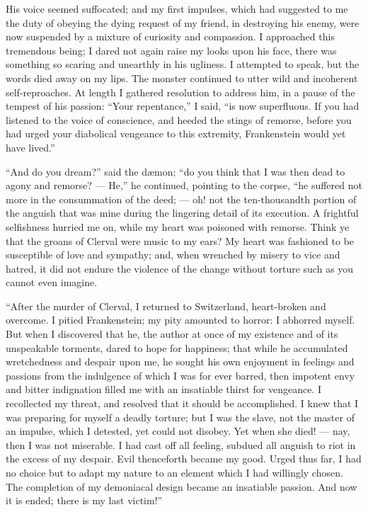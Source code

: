 His voice seemed suffocated; and
my first impulses, which had suggested
to me the duty of obeying the dying
request of my friend, in destroying his
enemy, were now suspended by a mixture
of curiosity and compassion. I
approached this tremendous being; I
dared not again raise my looks upon
his face, there was something so scaring
and unearthly in his ugliness. I
attempted to speak, but the words died
away on my lips. The monster continued
to utter wild and incoherent self-reproaches.
At length I gathered resolution
to address him, in a pause of the
tempest of his passion: ``Your repentance,''
I said, ``is now superfluous.
If you had listened to the voice of conscience,
and heeded the stings of remorse,
before you had urged your diabolical
vengeance to this extremity,
Frankenstein would yet have lived.''

``And do you dream?'' said the dæmon;
``do you think that I was then
dead to agony and remorse? --- He,'' he
continued, pointing to the corpse, ``he
suffered not more in the consummation
of the deed; --- oh! not the ten-thousandth
portion of the anguish that was
mine during the lingering detail of its
execution. A frightful selfishness hurried
me on, while my heart was poisoned
with remorse. Think ye that
the groans of Clerval were music to
my ears? My heart was fashioned to
be susceptible of love and sympathy;
and, when wrenched by misery to vice
and hatred, it did not endure the violence
of the change without torture
such as you cannot even imagine.

``After the murder of Clerval, I returned
to Switzerland, heart-broken
and overcome. I pitied Frankenstein;
my pity amounted to horror: I abhorred
myself. But when I discovered
that he, the author at once of my existence
and of its unspeakable torments,
dared to hope for happiness; that while
he accumulated wretchedness and despair
upon me, he sought his own enjoyment
in feelings and passions from
the indulgence of which I was for ever
barred, then impotent envy and bitter
indignation filled me with an insatiable
thirst for vengeance. I recollected my
threat, and resolved that it should be
accomplished. I knew that I was preparing
for myself a deadly torture; but
I was the slave, not the master of an
impulse, which I detested, yet could
not disobey. Yet when she died! --- nay,
then I was not miserable. I had cast
off all feeling, subdued all anguish
to riot in the excess of my despair.
Evil thenceforth became my good.
Urged thus far, I had no choice but to
adapt my nature to an element which
I had willingly chosen. The completion
of my demoniacal design became
an insatiable passion. And now it
is ended; there is my last victim!''

